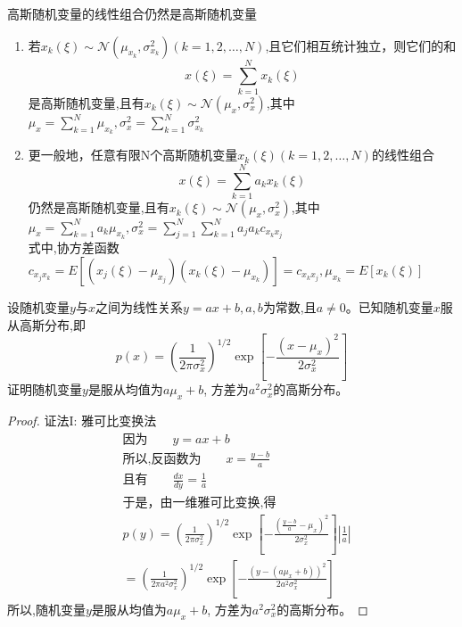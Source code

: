 \begin{frame}{高斯随机变量的线性组合仍然是高斯随机变量}
\begin{enumerate}
	\item 若$x_k(\xi)\sim\mathcal{N}(\mu_{x_k},\sigma_{x_k}^2)(k=1,2,\dots,N)$,且它们相互统计独立，则它们的和
	\[x(\xi)=\sum\limits_{k=1}^{N}x_k(\xi) \]
	是高斯随机变量,且有$x_k(\xi)\sim\mathcal{N}(\mu_x,\sigma_x^2)$,其中
	$\mu_x=\sum\limits_{k=1}^N\mu_{x_k},\sigma_x^2=\sum\limits_{k=1}^N\sigma_{x_k}^2$
	\item 更一般地，任意有限N个高斯随机变量$x_k(\xi)(k=1,2,\dots,N)$的线性组合
	\[x(\xi)=\sum\limits_{k=1}^{N}a_kx_k(\xi) \]
	仍然是高斯随机变量,且有$x_k(\xi)\sim\mathcal{N}(\mu_x,\sigma_x^2)$,其中
	$\mu_x=\sum\limits_{k=1}^Na_k\mu_{x_k},\sigma_x^2=\sum\limits_{j=1}^N\sum\limits_{k=1}^Na_ja_kc_{x_kx_j}$\\
	式中,协方差函数$c_{x_jx_k}=E[(x_j(\xi)-\mu_{x_j})(x_k(\xi)-\mu_{x_k})]=c_{x_kx_j},\mu_{x_k}=E[x_k(\xi)]$
\end{enumerate}
\end{frame}

\begin{frame}
\begin{example}
	设随机变量$y$与$x$之间为线性关系$y=ax+b,a,b$为常数,且$a\ne 0$。已知随机变量$x$服从高斯分布,即
	\[p(x)=\left(\frac{1}{2\pi\sigma_x^2}\right)^{1/2}\exp\left[-\frac{(x-\mu_x)^2}{2\sigma_x^2}\right] \]
	证明随机变量$y$是服从均值为$a\mu_x+b$, 方差为$a^2\sigma_x^2$的高斯分布。
\end{example}
\end{frame}

\begin{frame}
\begin{proof}
证法I: 雅可比变换法
\begin{align*}
&\text{因为}\qquad  y=ax+b \\
&\text{所以,反函数为}\qquad  x=\frac{y-b}{a} \\
&\text{且有}\qquad  \frac{dx}{dy}=\frac{1}{a} \\
&\text{于是，由一维雅可比变换,得}  \\
&p(y)=\left(\frac{1}{2\pi\sigma_x^2}\right)^{1/2}\exp\left[-\frac{(\frac{y-b}{a}-\mu_x)^2}{2\sigma_x^2}\right]\left|\frac{1}{a}\right| \\
&=\left(\frac{1}{2\pi  a^2\sigma_x^2}\right)^{1/2}\exp\left[-\frac{(y-(a\mu_x+b))^2}{2a^2\sigma_x^2}\right]  
\end{align*}
所以,随机变量$y$是服从均值为$a\mu_x+b$, 方差为$a^2\sigma_x^2$的高斯分布。
\end{proof}
\end{frame}

